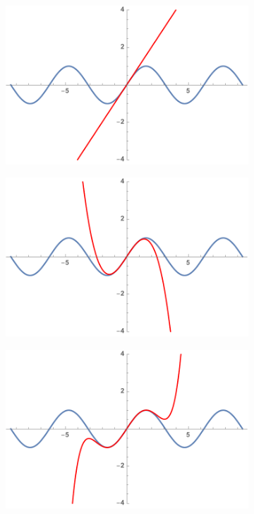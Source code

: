\begin{figure}[h]
	\centering
	\begin{subfigure}[t]{0.24\textwidth}
		\centering
		\includegraphics[width=\textwidth]{./Images/Ch03/sinP1.pdf}
	\end{subfigure}
	\begin{subfigure}[t]{0.24\textwidth}
		\centering
		\includegraphics[width=\textwidth]{./Images/Ch03/sinP3.pdf}
	\end{subfigure}
	\begin{subfigure}[t]{0.24\textwidth}
		\centering
		\includegraphics[width=\textwidth]{./Images/Ch03/sinP5.pdf}

\end{subfigure}
\end{figure}
